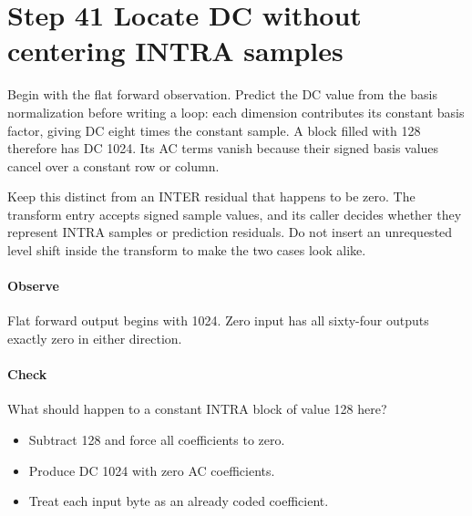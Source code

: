 \section{Step 41 Locate DC without centering INTRA samples}\label{h263-transform-s01}
Begin with the flat forward observation. Predict the DC value from the basis
normalization before writing a loop: each dimension contributes its constant
basis factor, giving DC eight times the constant sample. A block filled with
128 therefore has DC 1024. Its AC terms vanish because their signed basis values
cancel over a constant row or column.

Keep this distinct from an INTER residual that happens to be zero. The transform
entry accepts signed sample values, and its caller decides whether they represent
INTRA samples or prediction residuals. Do not insert an unrequested level shift
inside the transform to make the two cases look alike.

\paragraph{Observe} Flat forward output begins with 1024. Zero input has all
sixty-four outputs exactly zero in either direction.
\paragraph{Check} What should happen to a constant INTRA block of value 128 here?
\begin{itemize}
  \item[A.] Subtract 128 and force all coefficients to zero.
  \item[B.] Produce DC 1024 with zero AC coefficients.
  \item[C.] Treat each input byte as an already coded coefficient.
\end{itemize}
